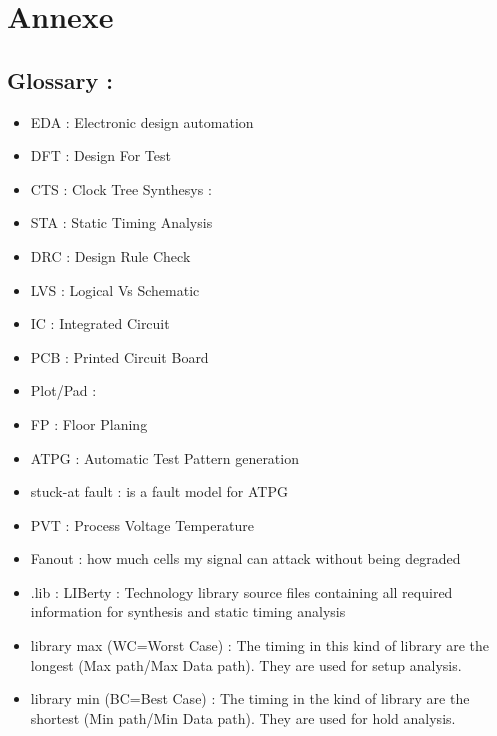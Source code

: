 \documentclass[11pt,a4paper,sans,dvipsnames]{report}
\begin{document}
	\newpage
	\listoffigures



	\newpage
	\chapter{Annexe}
	\section{Glossary :}

	\begin{itemize}
		\item EDA : Electronic design automation
		\item DFT : Design For Test %
		\item CTS : Clock Tree Synthesys : %
		\item STA : Static Timing Analysis  %
		\item DRC : Design Rule Check %
		\item LVS : Logical Vs Schematic %
		\item IC : Integrated Circuit
		\item PCB : Printed Circuit Board
		\item Plot/Pad : %
		\item FP : Floor Planing %
		\item ATPG : Automatic Test Pattern generation
		\item stuck-at fault : is a fault model for ATPG %
		\item PVT : Process Voltage Temperature %
		\item Fanout : how much cells my signal can attack without being degraded
		\item .lib : LIBerty : Technology library source files containing all required information for synthesis and static timing analysis
		\item library max (WC=Worst Case) : The timing in this kind of library are the longest (Max path/Max Data path). They are used for setup analysis. 
		\item library min (BC=Best Case) : The timing in the kind of library are the shortest (Min path/Min Data path). They are used for hold analysis.


\end{itemize}
\end{document}
